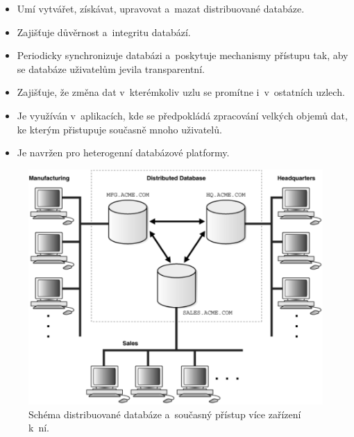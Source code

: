 \begin{itemize}
\item Umí vytvářet, získávat, upravovat a~mazat distribuované databáze.

\item Zajišťuje důvěrnost a~integritu databází.

\item Periodicky synchronizuje databázi a~poskytuje mechanismy přístupu tak, aby se databáze uživatelům jevila transparentní.

\item Zajišťuje, že změna dat v~kterémkoliv uzlu se promítne i~v~ostatních uzlech.

\item Je využíván v~aplikacích, kde se předpokládá zpracování velkých objemů dat, ke kterým přistupuje současně mnoho uživatelů.

\item Je navržen pro heterogenní databázové platformy.
\end{itemize}

\begin{figure}[!h]
  \centering
  \includegraphics[width=15cm]{template-fig/Distributed_database.pdf}
  \caption{Schéma distribuované databáze a~současný přístup více zařízení k~ní. \cite{distributedDBMSPic}}
  \label{FIG_DistrDB}
\end{figure}


